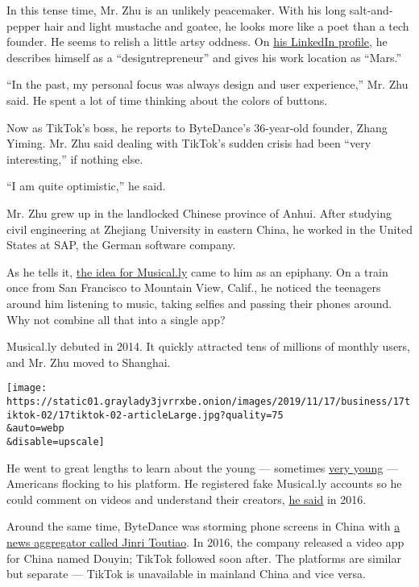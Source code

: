In this tense time, Mr. Zhu is an unlikely peacemaker. With his long
salt-and-pepper hair and light mustache and goatee, he looks more like a
poet than a tech founder. He seems to relish a little artsy oddness. On
\href{https://www.linkedin.com/in/keepsilence/}{his LinkedIn profile},
he describes himself as a ``designtrepreneur'' and gives his work
location as ``Mars.''

``In the past, my personal focus was always design and user
experience,'' Mr. Zhu said. He spent a lot of time thinking about the
colors of buttons.

Now as TikTok's boss, he reports to ByteDance's 36-year-old founder,
Zhang Yiming. Mr. Zhu said dealing with TikTok's sudden crisis had been
``very interesting,'' if nothing else.

``I am quite optimistic,'' he said.

Mr. Zhu grew up in the landlocked Chinese province of Anhui. After
studying civil engineering at Zhejiang University in eastern China, he
worked in the United States at SAP, the German software company.

As he tells it,
\href{https://www.nytimes3xbfgragh.onion/2016/08/10/technology/china-homegrown-internet-companies-rest-of-the-world.html}{the
idea for Musical.ly} came to him as an epiphany. On a train once from
San Francisco to Mountain View, Calif., he noticed the teenagers around
him listening to music, taking selfies and passing their phones around.
Why not combine all that into a single app?

Musical.ly debuted in 2014. It quickly attracted tens of millions of
monthly users, and Mr. Zhu moved to Shanghai.

\texttt{[image: https://static01.graylady3jvrrxbe.onion/images/2019/11/17/business/17tiktok-02/17tiktok-02-articleLarge.jpg?quality=75\\\&auto=webp\\\&disable=upscale]}

He went to great lengths to learn about the young --- sometimes
\href{https://www.nytimes3xbfgragh.onion/2016/09/17/business/media/a-social-network-frequented-by-children-tests-the-limits-of-online-regulation.html}{very
young} --- Americans flocking to his platform. He registered fake
Musical.ly accounts so he could comment on videos and understand their
creators, \href{https://www.youtube.com/watch?v=wTyg2E44pBA}{he said} in
2016.

Around the same time, ByteDance was storming phone screens in China with
\href{https://www.nytimes3xbfgragh.onion/2018/01/02/business/china-toutiao-censorship.html}{a
news aggregator called Jinri Toutiao}. In 2016, the company released a
video app for China named Douyin; TikTok followed soon after. The
platforms are similar but separate --- TikTok is unavailable in mainland
China and vice versa.

